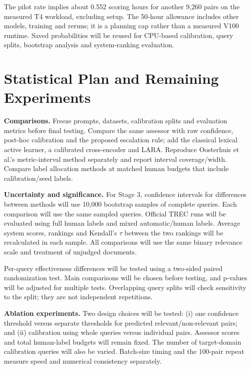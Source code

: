 \documentclass[11pt,a4paper]{article}
\begin{document}
The pilot rate implies about 0.552 scoring hours for another 9,260 pairs on the
measured T4 workload, excluding setup. The 50-hour allowance includes other models,
training and reruns; it is a planning cap rather than a measured V100 runtime.
Saved probabilities will be reused for CPU-based calibration, query splits,
bootstrap analysis and system-ranking evaluation.

\section{Statistical Plan and Remaining Experiments}
\textbf{Comparisons.} Freeze prompts, datasets, calibration splits and evaluation
metrics before final testing. Compare the same assessor with raw confidence,
post-hoc calibration and the proposed escalation rule; add the classical lexical
active learner, a calibrated cross-encoder and LARA. Reproduce Oosterhuis et al.'s
metric-interval method separately and report interval coverage/width. Compare label
allocation methods at matched human budgets that include calibration/seed labels.

\textbf{Uncertainty and significance.} For Stage 3, confidence intervals for differences
between methods will use 10,000 bootstrap samples of complete queries. Each comparison
will use the same sampled queries. Official TREC runs will be evaluated using full
human labels and mixed automatic/human labels. Average system scores, rankings and
Kendall's $\tau$ between the two rankings will be recalculated in each sample.
All comparisons will use the same binary relevance scale and treatment of unjudged
documents.

Per-query effectiveness differences will be tested using a two-sided paired
randomization test. Main comparisons will be chosen before testing, and p-values
will be adjusted for multiple tests. Overlapping query splits will check sensitivity
to the split; they are not independent repetitions.

\textbf{Ablation experiments.} Two design choices will be tested: (i) one confidence
threshold versus separate thresholds for predicted relevant/non-relevant pairs;
and (ii) calibration using whole queries versus individual pairs. Assessor scores
and total human-label budgets will remain fixed. The number of target-domain
calibration queries will also be varied. Batch-size timing and the 100-pair repeat
measure speed and numerical consistency separately.
\end{document}
